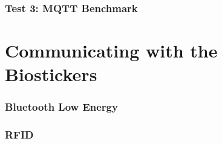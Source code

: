 \subsubsection{Test 3: \acs{MQTT} Benchmark}


\section{Communicating with the Biostickers}

\subsubsection{Bluetooth Low Energy}
\subsubsection{\acf{RFID}}

\renewcommand{\arraystretch}{1}